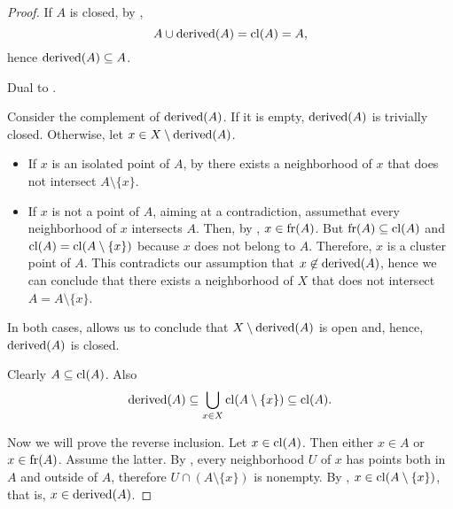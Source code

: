 \begin{proof}
  If \( A \) is closed, by ,
  \begin{equation*}
    A \cup \operatorname{derived}(A) = \operatorname{cl}(A) = A,
  \end{equation*}
  hence \( \operatorname{derived}(A) \subseteq A \).

   Dual to .

   Consider the complement of \( \operatorname{derived}(A) \). If it is empty, \( \operatorname{derived}(A) \) is trivially closed. Otherwise, let \( x \in X \setminus \operatorname{derived}(A) \).

  \begin{itemize}
    \item If \( x \) is an isolated point of \( A \), by  there exists a neighborhood of \( x \) that does not intersect \( A \setminus \{ x \} \).
    \item If \( x \) is not a point of \( A \), aiming at a contradiction, assume\LEM that every neighborhood of \( x \) intersects \( A \). Then, by , \( x \in \operatorname{fr}(A) \). But \( \operatorname{fr}(A) \subseteq \operatorname{cl}(A) \) and \( \operatorname{cl}(A) = \operatorname{cl}(A \setminus \{ x \}) \) because \( x \) does not belong to \( A \). Therefore, \( x \) is a cluster point of \( A \). This contradicts our assumption that \( x \not\in \operatorname{derived}(A) \), hence we can conclude that there exists a neighborhood of \( X \) that does not intersect \( A = A \setminus \{ x \} \).
  \end{itemize}

  In both cases,  allows us to conclude that \( X \setminus \operatorname{derived}(A) \) is open and, hence, \( \operatorname{derived}(A) \) is closed.

   Clearly \( A \subseteq \operatorname{cl}(A) \). Also
  \begin{equation*}
    \operatorname{derived}(A) \subseteq \bigcup_{x \in X} \operatorname{cl}(A \setminus \{ x \}) \subseteq \operatorname{cl}(A).
  \end{equation*}

  Now we will prove the reverse inclusion. Let \( x \in \operatorname{cl}(A) \). Then either \( x \in A \) or \( x \in \operatorname{fr}(A) \). Assume the latter. By , every neighborhood \( U \) of \( x \) has points both in \( A \) and outside of \( A \), therefore \( U \cap (A \setminus \{ x \}) \) is nonempty. By , \( x \in \operatorname{cl}(A \setminus \{ x \}) \), that is, \( x \in \operatorname{derived}(A) \).


\end{proof}

